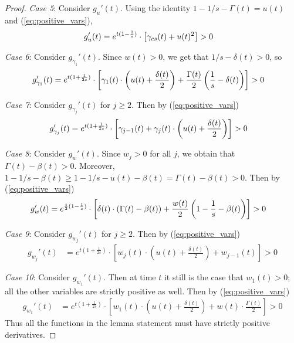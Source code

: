 \documentclass[a4paper,12pt]{article}
\begin{document}
\begin{proof}
\medskip

\noindent \emph{Case 5}: Consider $g_{u}'(t)$. Using the identity $1 - 1/s - \Gamma(t) = u(t)$ and (\ref{eq:positive_vars}),
\begin{align}
g_{u}'(t) & = e^{t(1 - \frac{1}{s})} \cdot \left[\gamma_{cs}(t) + u(t)^2 \right] > 0 \notag
\end{align}

\medskip

\noindent \emph{Case 6}: Consider $g_{\gamma_1}'(t)$. Since $w(t) > 0$, we get that $1/s - \delta(t) > 0$, so
\begin{align}
g_{\gamma_1}'(t) & = e^{t(1+\frac{1}{2s})} \cdot \left[ \gamma_1(t) \cdot \left(u(t) + \frac{\delta(t)}{2}\right) + \frac{\Gamma(t)}{2} \left(\frac{1}{s} - \delta(t)\right) \right] > 0 \notag
\end{align}

\noindent \emph{Case 7}: Consider $g_{\gamma_j}'(t)$ for $j \geq 2$. Then by (\ref{eq:positive_vars})
\begin{align}
g_{\gamma_j}'(t) &=  e^{t(1+\frac{1}{2s})} \cdot \left[ \gamma_{j-1}(t) + \gamma_j(t) \cdot \left(u(t) + \frac{\delta(t)}{2}\right) \right] > 0 \notag
\end{align}

\medskip

\noindent \emph{Case 8}: Consider $g_{w}'(t)$. Since $w_j > 0$ for all $j$, we obtain that $\Gamma(t) - \beta(t) > 0$. Moreover, $1 - 1/s - \beta(t) \geq 1 - 1/s - u(t) - \beta(t) = \Gamma(t) - \beta(t) > 0$. Then by (\ref{eq:positive_vars})
\begin{align}
g_{w}'(t) & = e^{\frac{t}{2}(1-\frac{1}{s})} \cdot \left[ \delta(t) \cdot \left(\Gamma(t) - \beta(t)\right) + \frac{w(t)}{2}\left(1 - \frac{1}{s} - \beta(t)\right) \right] > 0 \notag
\end{align}

\medskip

\noindent \emph{Case 9}: Consider $g_{w_j}'(t)$ for $j \geq 2$. Then by (\ref{eq:positive_vars})
\begin{align}
g_{w_j}'(t) & = e^{t(1 + \frac{1}{2s})} \cdot \left[ w_j(t) \cdot \left(u(t) + \frac{\delta(t)}{2} \right) + w_{j-1}(t) \right] > 0
\end{align}
\medskip

\noindent \emph{Case 10}: Consider $g_{w_1}'(t)$. Then at time $t$ it still is the case that $w_1(t) > 0$; all the other variables are strictly positive as well. Then by (\ref{eq:positive_vars})
\begin{align}
g_{w_1}'(t) &= e^{t(1 + \frac{1}{2s})} \cdot \left[  w_1(t) \cdot \left(u(t) + \frac{\delta(t)}{2}\right) + w(t) \cdot \frac{\Gamma(t)}{2} \right] > 0
\end{align}
Thus all the functions in the lemma statement must have strictly positive derivatives.
\end{proof}
\end{document}
